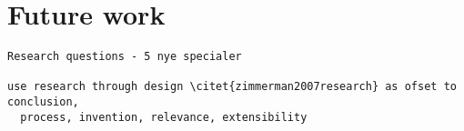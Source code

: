 
\section{Future work}


\begin{verbatim}
Research questions - 5 nye specialer

use research through design \citet{zimmerman2007research} as ofset to conclusion,
  process, invention, relevance, extensibility 

\end{verbatim}


